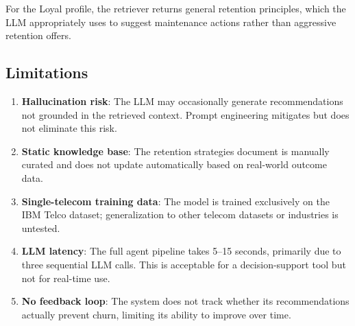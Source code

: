 For the Loyal profile, the retriever returns general retention principles, which the LLM
appropriately uses to suggest maintenance actions rather than aggressive retention offers.

\subsection{Limitations}

\begin{enumerate}[leftmargin=*]
    \item \textbf{Hallucination risk}: The LLM may occasionally generate recommendations
        not grounded in the retrieved context. Prompt engineering mitigates but does not
        eliminate this risk.
    \item \textbf{Static knowledge base}: The retention strategies document is manually
        curated and does not update automatically based on real-world outcome data.
    \item \textbf{Single-telecom training data}: The model is trained exclusively on the
        IBM Telco dataset; generalization to other telecom datasets or industries is untested.
    \item \textbf{LLM latency}: The full agent pipeline takes 5--15 seconds, primarily due
        to three sequential LLM calls. This is acceptable for a decision-support tool but
        not for real-time use.
    \item \textbf{No feedback loop}: The system does not track whether its recommendations
        actually prevent churn, limiting its ability to improve over time.
\end{enumerate}
